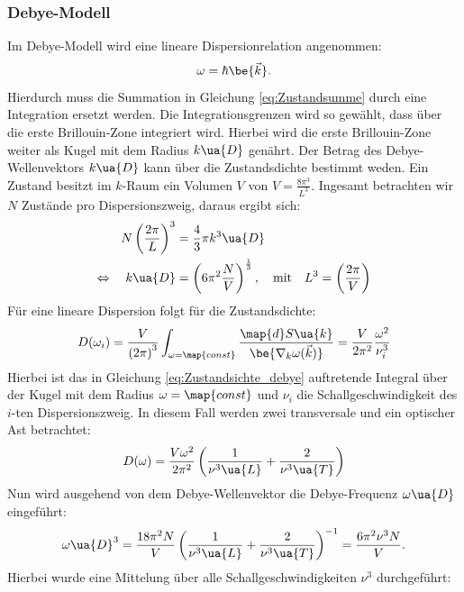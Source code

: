 \subsubsection{Debye-Modell}
Im Debye-Modell wird eine lineare Dispersionrelation angenommen:
\begin{equation*}
   \omega = \hbar \be{\vec{k}}.
\end{equation*}
Hierdurch muss die Summation in Gleichung \eqref{eq:Zustandsumme} durch eine
Integration ersetzt werden. Die Integrationsgrenzen wird so gewählt, dass über die
erste Brillouin-Zone integriert wird. Hierbei wird die erste Brillouin-Zone
weiter als Kugel mit dem Radius $k\ua{D}$ genährt. Der Betrag des Debye-Wellenvektors
$k\ua{D}$ kann über die Zustandsdichte bestimmt weden. Ein Zustand besitzt im $k$-Raum
ein Volumen $V$ von $V=\frac{8\pi^3}{L^3}$. Ingesamt betrachten wir $N$ Zustände pro
Dispersionszweig, daraus ergibt sich:
\begin{align*}
  N\left(\frac{2\pi}{L}\right)^3 &= \frac{4}{3}\pi k^3\ua{D} \\
  \Leftrightarrow \quad k\ua{D}&=\left(6\pi^2 \frac{N}{V}\right)^{\frac{1}{3}}, \quad \text{mit} \quad L^3 = \left(\frac{2\pi}{V}\right)
\end{align*}
Für eine lineare Dispersion folgt für die Zustandsdichte:
\begin{equation}
  \label{eq:Zustandsichte_debye}
D(\omega_i) = \frac{V}{\left(2\pi\right)^3} \int_{\omega=\map{const}} \frac{\map{d}S\ua{k}}{\be{\nabla_k \omega(\vec{k})}}= \frac{V}{2\pi^2}\frac{\omega^2}{\nu_i^3}
\end{equation}
Hierbei ist das in Gleichung \eqref{eq:Zustandsichte_debye} auftretende Integral
über der Kugel mit dem Radius $\omega=\map{const}$ und $\nu_i$ die Schallgeschwindigkeit
des $i$-ten Dispersionszweig. In diesem Fall werden zwei transversale und ein optischer
Ast betrachtet:
\begin{equation}
  \label{eq:Zustandsdichte_all_togther}
  D(\omega) = \frac{V \omega^2}{2\pi^2} \left(\frac{1}{\nu^3\ua{L}} + \frac{2}{\nu^3\ua{T}}\right)
\end{equation}
Nun wird ausgehend von dem Debye-Wellenvektor die Debye-Frequenz $\omega\ua{D}$ eingeführt:
\begin{equation}
  \label{eq:Debye_freuqenz}
  \omega\ua{D}^3 = \frac{18 \pi^2 N}{V}\left(\frac{1}{\nu^3\ua{L}} + \frac{2}{\nu^3\ua{T}}\right)^{-1}=\frac{6\pi^2\nu^3N}{V}.
\end{equation}
Hierbei wurde eine Mittelung über alle Schallgeschwindigkeiten $\nu^3$ durchgeführt:
